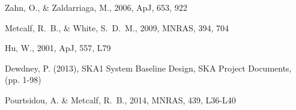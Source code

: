 \documentclass{PoS}
\begin{document}
\begin{thebibliography}{99}

 Zahn, O., \& Zaldarriaga, M., 2006, ApJ, 653, 922

Metcalf, R.~B., \& White, S.~D.~M., 2009, MNRAS, 394, 704

Hu, W., 2001, ApJ, 557, L79

Dewdney, P. (2013), SKA1 System Baseline Design, SKA Project Documents, (pp. 1-98)

Pourtsidou, A. \& {Metcalf}, R.~B., 2014, MNRAS, 439, L36-L40

\end{thebibliography}
\end{document}
